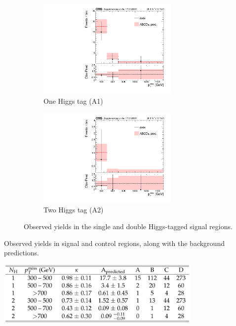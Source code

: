 \begin{figure}[htbp]
\begin{subfigure}[b]{0.5\textwidth}
\begin{centering}
\includegraphics[width=0.75\textwidth]{figs/Data_singleHiggsRegion.pdf}
\caption{One Higgs tag (A1)}
\end{centering}
\end{subfigure}
\begin{subfigure}[b]{0.5\textwidth}
\begin{centering}
\includegraphics[width=0.75\textwidth]{figs/Data_doubleHiggsRegion.pdf}
\caption{Two Higgs tag (A2)}
\end{centering}
\end{subfigure}
\caption{Observed yields in the single and double Higgs-tagged signal regions.}
\label{fig:signalyields}
\end{figure}

\begin{table}[htbp]
\begin{center}
\caption{Observed yields in signal and control regions, along with the background predictions.}
\label{tab:yieldstable}
\includegraphics[width=0.75\textwidth]{figs/CMS-SUS-17-006_Table-aux_001.pdf}
\end{center}
\end{table}

